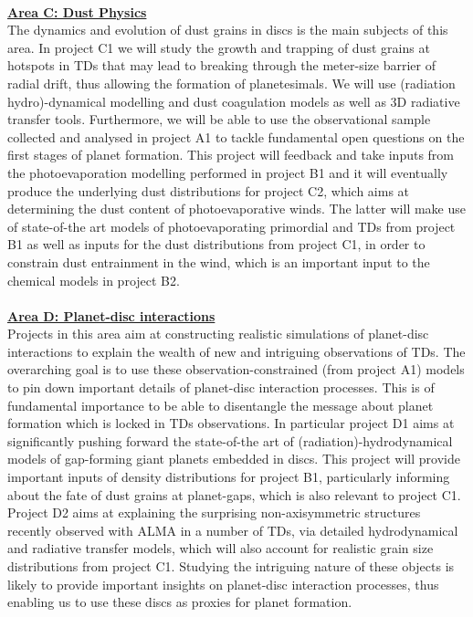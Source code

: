\documentclass[12pt]{article}
\begin{document}
%
\mbox{}\vspace{1em}\\
\noindent\underline{\bf Area C: Dust Physics}\\
\noindent The dynamics and evolution of dust grains in discs is the
main subjects of this area. In project C1 we will study the growth and
trapping of dust grains at hotspots in TDs that may lead
to breaking through the meter-size barrier of radial drift, thus
allowing the formation of planetesimals. We will use (radiation
hydro)-dynamical modelling and dust coagulation models as well as 3D
radiative transfer tools. Furthermore, we will be able to use the
observational sample collected and analysed in project A1 to tackle
fundamental open questions on the first stages of planet
formation. This project will feedback and take inputs from the
photoevaporation modelling performed in project B1 and it will
eventually produce
the underlying dust distributions for project C2, which aims at
determining the dust content of photoevaporative winds. The latter
will make use of state-of-the art models of photoevaporating
primordial and TDs from project B1 as well as inputs for the dust distributions from
project C1, in order to constrain dust entrainment in the wind, which
is an important input to the chemical models in project B2. \\ 




\mbox{}\vspace{1em}\\
\noindent\underline{\bf Area D: Planet-disc interactions}\\
\noindent Projects in this area aim at constructing realistic
simulations of planet-disc interactions to explain the wealth of new
and intriguing observations of TDs. The overarching goal is to use
these observation-constrained (from project A1) models to pin down
important details of planet-disc interaction processes. This is of
fundamental importance to be able to disentangle the message about
planet formation which is locked in TDs observations. In particular
project D1 aims at significantly pushing forward the state-of-the art
of (radiation)-hydrodynamical models of gap-forming giant planets
embedded in discs. This project will provide important inputs of
density distributions for project B1, particularly informing about the
fate of dust grains at planet-gaps, which is also relevant to project
C1. Project D2 aims at explaining the surprising non-axisymmetric
structures recently observed with ALMA in a number of TDs, via
detailed hydrodynamical and radiative transfer models, which will also
account for realistic grain size distributions from project
C1. Studying the intriguing nature of these objects is likely to
provide important insights on planet-disc interaction processes, thus
enabling us to use these discs as proxies for planet formation.  \\ 
\end{document}
